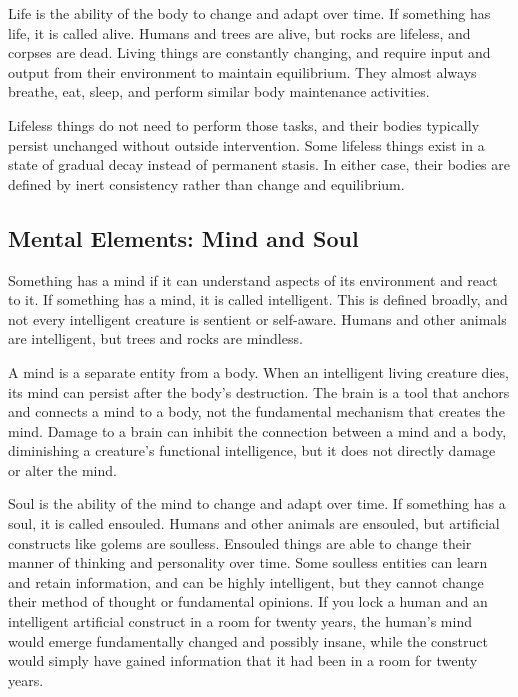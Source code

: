     Life is the ability of the body to change and adapt over time.
    If something has life, it is called alive.
    Humans and trees are alive, but rocks are lifeless, and corpses are dead.
    Living things are constantly changing, and require input and output from their environment to maintain equilibrium.
    They almost always breathe, eat, sleep, and perform similar body maintenance activities.

    Lifeless things do not need to perform those tasks, and their bodies typically persist unchanged without outside intervention.
    Some lifeless things exist in a state of gradual decay instead of permanent stasis.
    In either case, their bodies are defined by inert consistency rather than change and equilibrium.

  \subsection{Mental Elements: Mind and Soul}
    Something has a mind if it can understand aspects of its environment and react to it.
    If something has a mind, it is called intelligent.
    This is defined broadly, and not every intelligent creature is sentient or self-aware.
    Humans and other animals are intelligent, but trees and rocks are mindless.

    A mind is a separate entity from a body.
    When an intelligent living creature dies, its mind can persist after the body's destruction.
    The brain is a tool that anchors and connects a mind to a body, not the fundamental mechanism that creates the mind.
    Damage to a brain can inhibit the connection between a mind and a body, diminishing a creature's functional intelligence, but it does not directly damage or alter the mind.

    Soul is the ability of the mind to change and adapt over time.
    If something has a soul, it is called ensouled.
    Humans and other animals are ensouled, but artificial constructs like golems are soulless.
    Ensouled things are able to change their manner of thinking and personality over time.
    Some soulless entities can learn and retain information, and can be highly intelligent, but they cannot change their method of thought or fundamental opinions.
    If you lock a human and an intelligent artificial construct in a room for twenty years, the human's mind would emerge fundamentally changed and possibly insane, while the construct would simply have gained information that it had been in a room for twenty years.

